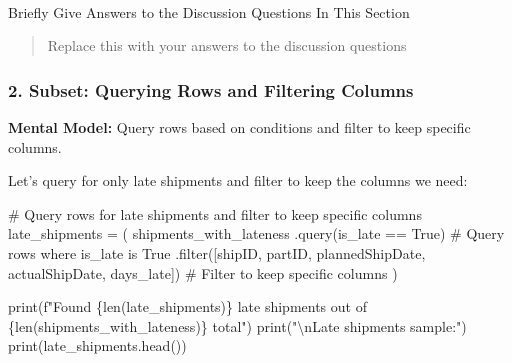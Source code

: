 \documentclass[
  letterpaper,
  DIV=11,
  numbers=noendperiod]{scrartcl}
\makeatletter
\let\oldparagraph\paragraph
\renewcommand{\paragraph}{
    \@ifstar
      \xxxParagraphStar
      \xxxParagraphNoStar
  }
\newcommand{\xxxParagraphStar}[1]{\oldparagraph*{#1}\mbox{}}
\newcommand{\xxxParagraphNoStar}[1]{\oldparagraph{#1}\mbox{}}
\newenvironment{Shaded}{\begin{snugshade}}{\end{snugshade}}
\newcommand{\BuiltInTok}[1]{\textcolor[rgb]{0.00,0.23,0.31}{#1}}
\newcommand{\CharTok}[1]{\textcolor[rgb]{0.13,0.47,0.30}{#1}}
\newcommand{\CommentTok}[1]{\textcolor[rgb]{0.37,0.37,0.37}{#1}}
\newcommand{\NormalTok}[1]{\textcolor[rgb]{0.00,0.23,0.31}{#1}}
\newcommand{\OperatorTok}[1]{\textcolor[rgb]{0.37,0.37,0.37}{#1}}
\newcommand{\SpecialCharTok}[1]{\textcolor[rgb]{0.37,0.37,0.37}{#1}}
\newcommand{\SpecialStringTok}[1]{\textcolor[rgb]{0.13,0.47,0.30}{#1}}
\newcommand{\StringTok}[1]{\textcolor[rgb]{0.13,0.47,0.30}{#1}}
\makeatother
\begin{document}
\paragraph{Briefly Give Answers to the Discussion Questions In This
Section}\label{briefly-give-answers-to-the-discussion-questions-in-this-section}

\begin{quote}
Replace this with your answers to the discussion questions
\end{quote}

\subsubsection{2. Subset: Querying Rows and Filtering
Columns}\label{subset-querying-rows-and-filtering-columns}

\textbf{Mental Model:} Query rows based on conditions and filter to keep
specific columns.

Let's query for only late shipments and filter to keep the columns we
need:

\label{mental-model-2-subset}
\begin{Shaded}
\begin{Highlighting}[]
\CommentTok{\# Query rows for late shipments and filter to keep specific columns}
\NormalTok{late\_shipments }\OperatorTok{=}\NormalTok{ (}
\NormalTok{    shipments\_with\_lateness}
\NormalTok{    .query(}\StringTok{\textquotesingle{}is\_late == True\textquotesingle{}}\NormalTok{)  }\CommentTok{\# Query rows where is\_late is True}
\NormalTok{    .}\BuiltInTok{filter}\NormalTok{([}\StringTok{\textquotesingle{}shipID\textquotesingle{}}\NormalTok{, }\StringTok{\textquotesingle{}partID\textquotesingle{}}\NormalTok{, }\StringTok{\textquotesingle{}plannedShipDate\textquotesingle{}}\NormalTok{, }\StringTok{\textquotesingle{}actualShipDate\textquotesingle{}}\NormalTok{, }\StringTok{\textquotesingle{}days\_late\textquotesingle{}}\NormalTok{])  }\CommentTok{\# Filter to keep specific columns}
\NormalTok{)}

\BuiltInTok{print}\NormalTok{(}\SpecialStringTok{f"Found }\SpecialCharTok{\{}\BuiltInTok{len}\NormalTok{(late\_shipments)}\SpecialCharTok{\}}\SpecialStringTok{ late shipments out of }\SpecialCharTok{\{}\BuiltInTok{len}\NormalTok{(shipments\_with\_lateness)}\SpecialCharTok{\}}\SpecialStringTok{ total"}\NormalTok{)}
\BuiltInTok{print}\NormalTok{(}\StringTok{"}\CharTok{\textbackslash{}n}\StringTok{Late shipments sample:"}\NormalTok{)}
\BuiltInTok{print}\NormalTok{(late\_shipments.head())}
\end{Highlighting}
\end{Shaded}
\end{document}
